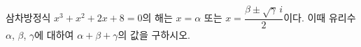 삼차방정식 $x^3+x^2+2x+8=0$의 해는 $x=\alpha$ 또는 $x=\dfrac{\beta\pm\sqrt{\gamma}\,i}{2}$이다. 이때 유리수 $\alpha$, $\beta$, $\gamma$에 대하여 $\alpha+\beta+\gamma$의 값을 구하시오.

